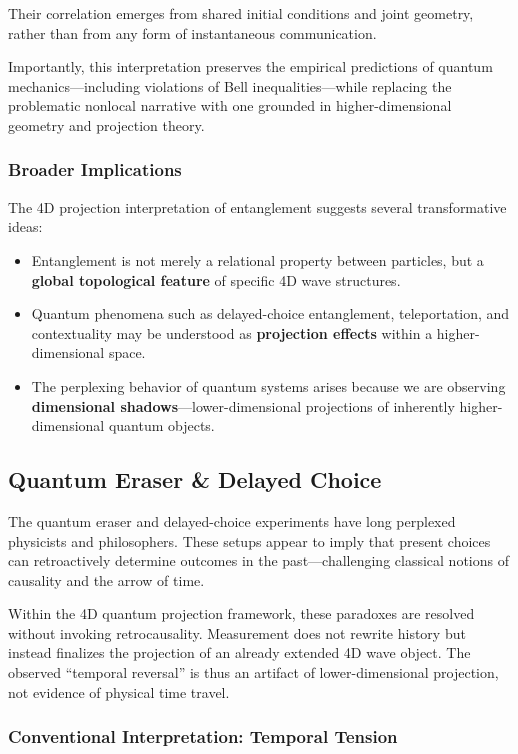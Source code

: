 \documentclass[12pt]{article}
\begin{document}
Their correlation emerges from shared initial conditions and joint geometry, rather than from any form of instantaneous communication.

Importantly, this interpretation preserves the empirical predictions of quantum mechanics—including violations of Bell inequalities—while replacing the problematic nonlocal narrative with one grounded in higher-dimensional geometry and projection theory.

\subsubsection{Broader Implications}

The 4D projection interpretation of entanglement suggests several transformative ideas:
\begin{itemize}
  \item Entanglement is not merely a relational property between particles, but a \textbf{global topological feature} of specific 4D wave structures.
  \item Quantum phenomena such as delayed-choice entanglement, teleportation, and contextuality may be understood as \textbf{projection effects} within a higher-dimensional space.
  \item The perplexing behavior of quantum systems arises because we are observing \textbf{dimensional shadows}—lower-dimensional projections of inherently higher-dimensional quantum objects.
\end{itemize}


\subsection{Quantum Eraser \& Delayed Choice}

The quantum eraser and delayed-choice experiments have long perplexed physicists and philosophers. These setups appear to imply that present choices can retroactively determine outcomes in the past—challenging classical notions of causality and the arrow of time.

Within the 4D quantum projection framework, these paradoxes are resolved without invoking retrocausality. Measurement does not rewrite history but instead finalizes the projection of an already extended 4D wave object. The observed “temporal reversal” is thus an artifact of lower-dimensional projection, not evidence of physical time travel.

\subsubsection{Conventional Interpretation: Temporal Tension}
\end{document}
